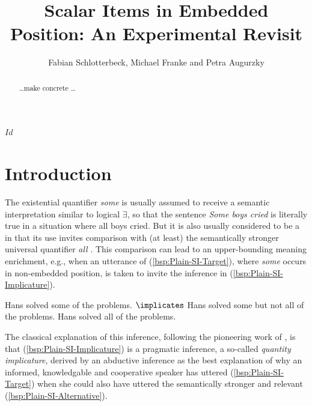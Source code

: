 \documentclass[fleqn,reqno,10pt,draft]{article}
\title{Scalar Items in Embedded Position: {A}n Experimental Revisit}
\author{Fabian Schlotterbeck, Michael Franke and Petra Augurzky}
\date{}
\begin{document}
\maketitle


\begin{abstract}
  \dots make concrete \dots
\end{abstract}

\svnInfo $Id$

\section{Introduction}
\label{sec:introduction}

The existential quantifier \emph{some} is usually assumed to receive a
semantic interpretation similar to logical $\exists$, so that the
sentence \emph{Some boys cried} is literally true in a situation where
all boys cried. But it is also usually considered to be a
 in that its use invites comparison with (at
least) the semantically stronger universal quantifier \emph{all}
\citep[c.f.][]{Horn1972:On-the-Semantic,Gazdar1979:Pragmatics:-Imp,AtlasLevinson1981}. This
comparison can lead to an upper-bounding meaning enrichment, e.g.,
when an utterance of (\ref{bsp:Plain-SI-Target}), where \emph{some}
occurs in non-embedded position, is taken to invite the inference in
(\ref{bsp:Plain-SI-Implicature}).

\begin{exe}
  \ex \label{bsp:Plain-SI}
    \begin{xlist}
      \ex \label{bsp:Plain-SI-Target} Hans solved some of the
        problems.
      \ex \label{bsp:Plain-SI-Implicature} $\implicates$ Hans solved
        some but not all of the problems.
      \ex \label{bsp:Plain-SI-Alternative} Hans solved all of the problems.
    \end{xlist}
\end{exe}

\noindent The classical explanation of this inference, following the
pioneering work of \citet{Grice1975:Logic-and-Conve} \citep[see][for
recent overview]{Geurts2010:Quantity-Implic}, is that
(\ref{bsp:Plain-SI-Implicature}) is a pragmatic inference, a so-called
\emph{quantity implicature}, derived by an abductive inference as the
best explanation of why an informed, knowledgable and cooperative
speaker has uttered (\ref{bsp:Plain-SI-Target}) when she could also have uttered the
semantically stronger and relevant (\ref{bsp:Plain-SI-Alternative}).
\end{document}

